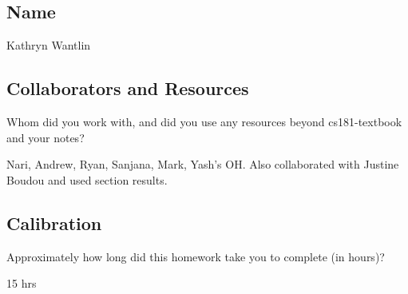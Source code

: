 \documentclass[submit]{harvardml}
\begin{document}
\newpage
\subsection*{Name}

Kathryn Wantlin

\subsection*{Collaborators and Resources}
Whom did you work with, and did you use any resources beyond cs181-textbook and your notes?

Nari, Andrew, Ryan, Sanjana, Mark, Yash's OH. Also collaborated with Justine Boudou and used section results.

\subsection*{Calibration}
Approximately how long did this homework take you to complete (in hours)?

15 hrs
\end{document}
